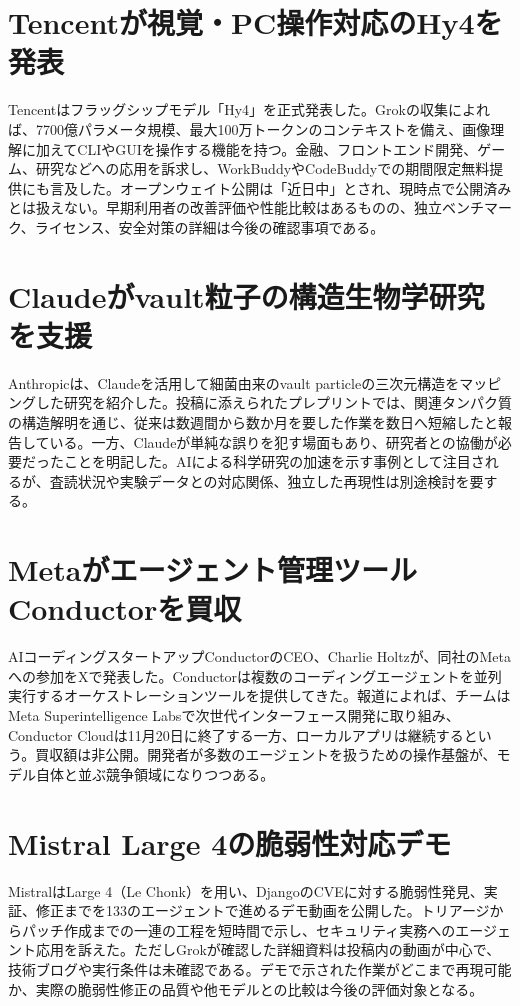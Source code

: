 \section{Tencentが視覚・PC操作対応のHy4を発表}
Tencentはフラッグシップモデル「Hy4」を正式発表した。Grokの収集によれば、7700億パラメータ規模、最大100万トークンのコンテキストを備え、画像理解に加えてCLIやGUIを操作する機能を持つ。金融、フロントエンド開発、ゲーム、研究などへの応用を訴求し、WorkBuddyやCodeBuddyでの期間限定無料提供にも言及した。オープンウェイト公開は「近日中」とされ、現時点で公開済みとは扱えない。早期利用者の改善評価や性能比較はあるものの、独立ベンチマーク、ライセンス、安全対策の詳細は今後の確認事項である。

\section{Claudeがvault粒子の構造生物学研究を支援}
Anthropicは、Claudeを活用して細菌由来のvault particleの三次元構造をマッピングした研究を紹介した。投稿に添えられたプレプリントでは、関連タンパク質の構造解明を通じ、従来は数週間から数か月を要した作業を数日へ短縮したと報告している。一方、Claudeが単純な誤りを犯す場面もあり、研究者との協働が必要だったことを明記した。AIによる科学研究の加速を示す事例として注目されるが、査読状況や実験データとの対応関係、独立した再現性は別途検討を要する。

\section{Metaがエージェント管理ツールConductorを買収}
AIコーディングスタートアップConductorのCEO、Charlie Holtzが、同社のMetaへの参加をXで発表した。Conductorは複数のコーディングエージェントを並列実行するオーケストレーションツールを提供してきた。報道によれば、チームはMeta Superintelligence Labsで次世代インターフェース開発に取り組み、Conductor Cloudは11月20日に終了する一方、ローカルアプリは継続するという。買収額は非公開。開発者が多数のエージェントを扱うための操作基盤が、モデル自体と並ぶ競争領域になりつつある。

\section{Mistral Large 4の脆弱性対応デモ}
MistralはLarge 4（Le Chonk）を用い、DjangoのCVEに対する脆弱性発見、実証、修正までを133のエージェントで進めるデモ動画を公開した。トリアージからパッチ作成までの一連の工程を短時間で示し、セキュリティ実務へのエージェント応用を訴えた。ただしGrokが確認した詳細資料は投稿内の動画が中心で、技術ブログや実行条件は未確認である。デモで示された作業がどこまで再現可能か、実際の脆弱性修正の品質や他モデルとの比較は今後の評価対象となる。

